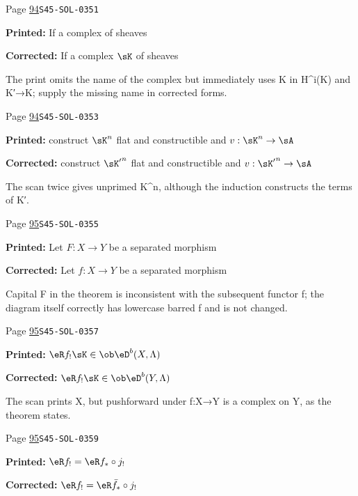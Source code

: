 \begin{description}
\smallskip
\item[\hypertarget{apparatus:EN-0032}{32}] Page \hyperlink{printpage:en:94}{94}\quad\texttt{S45-SOL-0351}
\par\noindent\textbf{Printed:} If a complex of sheaves
\par\noindent\textbf{Corrected:} If a complex $\sK$ of sheaves
\par\noindent The print omits the name of the complex but immediately uses K in H\textasciicircum{}i(K) and K′→K; supply the missing name in corrected forms.
\smallskip
\item[\hypertarget{apparatus:EN-0033}{33}] Page \hyperlink{printpage:en:94}{94}\quad\texttt{S45-SOL-0353}
\par\noindent\textbf{Printed:} construct $\sK^n$ flat and constructible and $v:\sK^n\to \sA$
\par\noindent\textbf{Corrected:} construct ${\sK'}^n$ flat and constructible and $v:{\sK'}^n\to \sA$
\par\noindent The scan twice gives unprimed K\textasciicircum{}n, although the induction constructs the terms of K′.
\smallskip
\item[\hypertarget{apparatus:EN-0034}{34}] Page \hyperlink{printpage:en:95}{95}\quad\texttt{S45-SOL-0355}
\par\noindent\textbf{Printed:} Let $F:X\to Y$ be a separated morphism
\par\noindent\textbf{Corrected:} Let $f:X\to Y$ be a separated morphism
\par\noindent Capital F in the theorem is inconsistent with the subsequent functor f; the diagram itself correctly has lowercase barred f and is not changed.
\smallskip
\item[\hypertarget{apparatus:EN-0035}{35}] Page \hyperlink{printpage:en:95}{95}\quad\texttt{S45-SOL-0357}
\par\noindent\textbf{Printed:} $\eR f_!\sK\in \ob \eD^b(X,\Lambda)$
\par\noindent\textbf{Corrected:} $\eR f_!\sK\in \ob \eD^b(Y,\Lambda)$
\par\noindent The scan prints X, but pushforward under f:X→Y is a complex on Y, as the theorem states.
\smallskip
\item[\hypertarget{apparatus:EN-0036}{36}] Page \hyperlink{printpage:en:95}{95}\quad\texttt{S45-SOL-0359}
\par\noindent\textbf{Printed:} $\eR f_! = \eR f_*\circ j_!$
\par\noindent\textbf{Corrected:} $\eR f_! = \eR \bar f_*\circ j_!$

\end{description}
